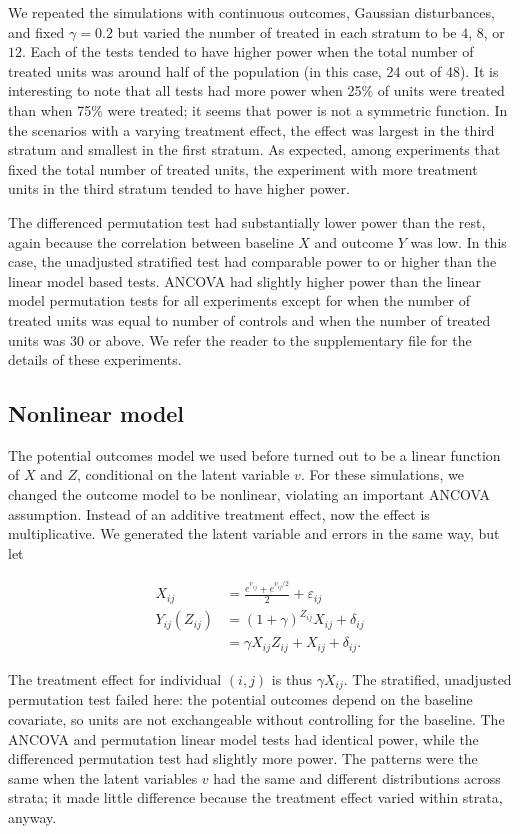 \documentclass[12pt]{article}
\begin{document}
We repeated the simulations with continuous outcomes, Gaussian disturbances, and fixed $\gamma=0.2$ but varied the number of treated in each stratum to be $4$, $8$, or $12$.
Each of the tests tended to have higher power when the total number of treated units was around half of the population (in this case, 24 out of 48).
It is interesting to note that all tests had more power when 25\% of units were treated than when 75\% were treated; it seems that power is not a symmetric function.
In the scenarios with a varying treatment effect, the  effect was largest in the third stratum and smallest in the first stratum.
As expected, among experiments that fixed the total number of treated units, the experiment with more treatment units in the third stratum tended to have higher power.

The differenced permutation test had substantially lower power than the rest,
again because the correlation between baseline $X$ and outcome $Y$ was low.
In this case, the unadjusted stratified test had comparable power to or higher than the linear model based tests.
ANCOVA had slightly higher power than the linear model permutation tests for all experiments except for when the number of treated units was equal to number of controls and when the number of treated units was 30 or above.
We refer the reader to the supplementary file for the details of these experiments.



\subsection{Nonlinear model}

The potential outcomes model we used before turned out to be a linear function of $X$ and $Z$, conditional on the latent variable $v$.
For these simulations, we changed the outcome model to be nonlinear, violating an important ANCOVA assumption.
Instead of an additive treatment effect, now the effect is multiplicative.
We generated the latent variable and errors in the same way, but let 


\begin{align*}
X_{ij} &=  \frac{ e^{v_{ij}} + e^{v_{ij}/2}}{2} +\varepsilon_{ij} \\
Y_{ij}(Z_{ij}) &= (1+\gamma)^{Z_{ij}} X_{ij}  + \delta_{ij} \\
&= \gamma X_{ij}Z_{ij} + X_{ij} + \delta_{ij}.
\end{align*}

The treatment effect for individual $(i, j)$ is thus $\gamma X_{ij}$.
The stratified, unadjusted permutation test failed here:
the potential outcomes depend on the baseline covariate, so units are not exchangeable without controlling for the baseline.
The ANCOVA and permutation linear model tests had identical power, while the differenced permutation test had slightly more power.
The patterns were the same when the latent variables $v$ had the same and different distributions across strata;
it made little difference because the treatment effect varied within strata, anyway.
\end{document}
